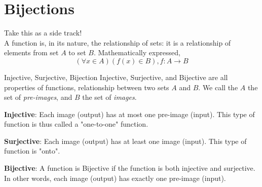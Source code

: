 \section{Bijections}
Take this as a side track! \\
A function is, in its nature, the relationship of sets: it is a relationship of elements from set $A$ to set $B$. Mathematically expressed, \\
\[(\forall x \in A) (f(x) \in B), f : A \rightarrow B\]
\begin{ln-define}{Injective, Surjective, Bijection}{}
    Injective, Surjective, and Bijective are all properties of functions, relationship between two sets $A$ and $B$. We call the $A$ the set of \textit{pre-images}, and $B$ the set of \textit{images}.
    \begin{bindenum}
        \item{
            \textbf{Injective}: Each image (output) has at most one pre-image (input). This type of function is thus called a "one-to-one" function.
            \begin{center}
            \end{center}
        }
        \item{
            \textbf{Surjective}: Each image (output) has at least one image (input). This type of function is "onto".
            \begin{center}
            \end{center}
        }
        \item {
            \textbf{Bijective}: A function is Bijective if the function is both injective and surjective. In other words, each image (output) has exactly one pre-image (input).
        }
    \end{bindenum}
\end{ln-define}
